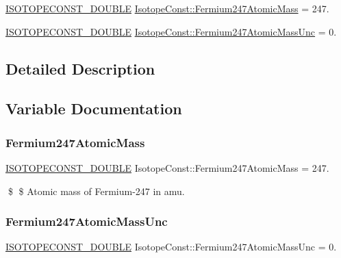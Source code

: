 \begin{DoxyCompactItemize}
\item 
\mbox{\hyperlink{group___isotope_const-_macros_ga8f45a7272ce02c0b4c65c44636ed719a}{I\+S\+O\+T\+O\+P\+E\+C\+O\+N\+S\+T\+\_\+\+D\+O\+U\+B\+LE}} \mbox{\hyperlink{group___isotope_const-_fermium-_fm247_ga552fca1643f52137e43ca47737dc0cda}{Isotope\+Const\+::\+Fermium247\+Atomic\+Mass}} = 247.
\item 
\mbox{\hyperlink{group___isotope_const-_macros_ga8f45a7272ce02c0b4c65c44636ed719a}{I\+S\+O\+T\+O\+P\+E\+C\+O\+N\+S\+T\+\_\+\+D\+O\+U\+B\+LE}} \mbox{\hyperlink{group___isotope_const-_fermium-_fm247_gabb7a9fba81cf737592565e95d72b33e9}{Isotope\+Const\+::\+Fermium247\+Atomic\+Mass\+Unc}} = 0.
\end{DoxyCompactItemize}


\subsection{Detailed Description}


\subsection{Variable Documentation}
\mbox{\label{group___isotope_const-_fermium-_fm247_ga552fca1643f52137e43ca47737dc0cda}} 
\subsubsection{\texorpdfstring{Fermium247\+Atomic\+Mass}{Fermium247AtomicMass}}
{\footnotesize\ttfamily \mbox{\hyperlink{group___isotope_const-_macros_ga8f45a7272ce02c0b4c65c44636ed719a}{I\+S\+O\+T\+O\+P\+E\+C\+O\+N\+S\+T\+\_\+\+D\+O\+U\+B\+LE}} Isotope\+Const\+::\+Fermium247\+Atomic\+Mass = 247.}

\$ \$ Atomic mass of Fermium-\/247 in amu. \mbox{\label{group___isotope_const-_fermium-_fm247_gabb7a9fba81cf737592565e95d72b33e9}} 
\subsubsection{\texorpdfstring{Fermium247\+Atomic\+Mass\+Unc}{Fermium247AtomicMassUnc}}
{\footnotesize\ttfamily \mbox{\hyperlink{group___isotope_const-_macros_ga8f45a7272ce02c0b4c65c44636ed719a}{I\+S\+O\+T\+O\+P\+E\+C\+O\+N\+S\+T\+\_\+\+D\+O\+U\+B\+LE}} Isotope\+Const\+::\+Fermium247\+Atomic\+Mass\+Unc = 0.}

